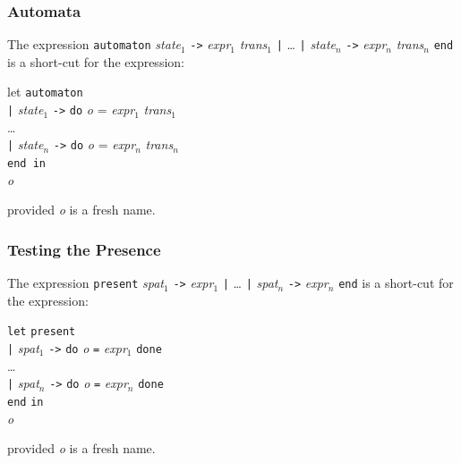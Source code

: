 \documentclass[11pt,titlepage,twoside]{report}
\newcommand{\In}{\mbox{{\tt in}}}
\newcommand{\Minusgreater}{\mbox{{\tt ->}}}
\newcommand{\term}[1]{{\tt #1}}
\newcommand{\nterm}[1]{{\em #1}}
\begin{document}
\subsubsection{Automata}
The expression 
\term{automaton} \nterm{state}$_1$ \term{\Minusgreater} \nterm{expr}$_1$ 
                 \nterm{trans}$_1$ 
\term{|} \dots
\term{|} \nterm{state}$_n$ \term{\Minusgreater} \nterm{expr}$_n$ 
                 \nterm{trans}$_n$ \term{end} is a short-cut
for the expression:

\begin{tabbing}
let \= \term{automaton} \\
    \> \term{|} \nterm{state}$_1$ \term{\Minusgreater} 
                 \term{do} \nterm{o} = \nterm{expr}$_1$ \nterm{trans}$_1$ \\
    \> \dots \\
    \> \term{|} \nterm{state}$_n$ \term{\Minusgreater} 
              \term{do} \nterm{o} = \nterm{expr}$_n$ \nterm{trans}$_n$ \\
    \> \term{end in} \\
\nterm{o}
\end{tabbing}
provided \nterm{o} is a fresh name.

\subsubsection{Testing the Presence}
The expression
\term{present}
  \nterm{spat}$_1$ \term{\Minusgreater} \nterm{expr}$_1$ \term{|} \dots 
\term{|} \nterm{spat}$_n$ \term{\Minusgreater} \nterm{expr}$_n$ \term{end}
is a short-cut for the expression:

\begin{center}
\begin{tabbing}
\term{let} \= \term{present} \\
           \> \term{|} \nterm{spat}$_1$ \term{\Minusgreater} 
               \term{do} \nterm{o} \term{=} \nterm{expr}$_1$ \term{done} \\
           \> \dots \\
           \> \term{|} \nterm{spat}$_n$ \term{\Minusgreater} 
               \term{do} \nterm{o} \term{=} \nterm{expr}$_n$ \term{done} \\
           \> \term{end} \In \\
\nterm{o}
\end{tabbing}
\end{center}
provided \nterm{o} is a fresh name.
\end{document}
